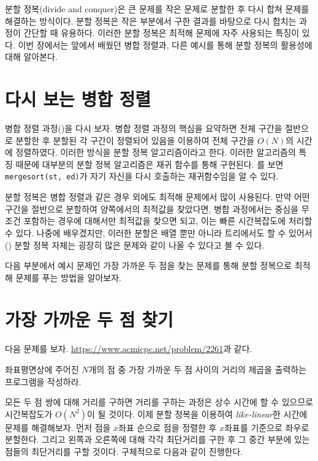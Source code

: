 분할 정복(divide and conquer)은 큰 문제를 작은 문제로 분할한 후 다시 합쳐 문제를 해결하는 방식이다. 분할 정복은 작은 부분에서 구한 결과를 바탕으로 다시 합치는 과정이 간단할 때 유용하다. 이러한 분할 정복은 최적해 문제에 자주 사용되는 특징이 있다. 이번 장에서는 앞에서 배웠던 병합 정렬과, 다른 예시를 통해 분할 정복의 활용성에 대해 알아본다.

\section{다시 보는 병합 정렬}
병합 정렬 과정()을 다시 보자. 병합 정렬 과정의 핵심을 요약하면 전체 구간을 절반으로 분할한 후 분할된 각 구간이 정렬되어 있음을 이용하여 전체 구간을 $O(N)$의 시간에 정렬하였다. 이러한 방식을 분할 정복 알고리즘이라고 한다. 이러한 알고리즘의 특징 때문에 대부분의 분할 정복 알고리즘은 재귀 함수를 통해 구현된다. 를 보면 \texttt{mergesort(st, ed)}가 자기 자신을 다시 호출하는 재귀함수임을 알 수 있다. 

분할 정복은 병합 정렬과 같은 경우 외에도 최적해 문제에서 많이 사용된다. 만약 어떤 구간을 절반으로 분할하여 양쪽에서의 최적값을 찾았다면, 병합 과정에서는 중심을 무조건 포함하는 경우에 대해서만 최적값을 찾으면 되고, 이는 빠른 시간복잡도에 처리할 수 있다. 나중에 배우겠지만, 이러한 분할은 배열 뿐만 아니라 트리에서도 할 수 있어서() 분할 정복 자체는 굉장히 많은 문제와 같이 나올 수 있다고 볼 수 있다.

다음 부분에서 예시 문제인 가장 가까운 두 점을 찾는 문제를 통해 분할 정복으로 최적해 문제를 푸는 방법을 알아보자.

\section{가장 가까운 두 점 찾기}
다음 문제를 보자. \url{https://www.acmicpc.net/problem/2261}과 같다.
\begin{example} \label{ex: nearest-two-points}
    좌표평면상에 주어진 $N$개의 점 중 가장 가까운 두 점 사이의 거리의 제곱을 출력하는 프로그램을 작성하라.
\end{example}

모든 두 점 쌍에 대해 거리를 구하면 거리를 구하는 과정은 상수 시간에 할 수 있으므로 시간복잡도가 $O(N^2)$이 될 것이다. 이제 분할 정복을 이용하여 \textit{like-linear}한 시간에 문제를 해결해보자. 먼저 점을 $x$좌표 순으로 점을 정렬한 후 $x$좌표를 기준으로 좌우로 분할한다. 그리고 왼쪽과 오른쪽에 대해 각각 최단거리를 구한 후 그 중간 부분에 있는 점들의 최단거리를 구할 것이다. 구체적으로 다음과 같이 진행한다.

